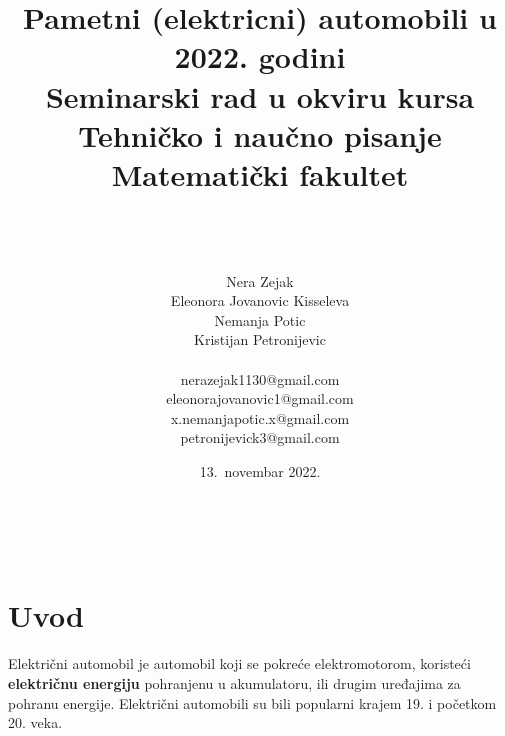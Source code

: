 \documentclass[a4paper]{article}
\begin{document}
\title{Pametni (elektricni) automobili u 2022. godini\vspace{3ex}\\
\small{Seminarski rad u okviru kursa\\
Tehničko i naučno pisanje\\
Matematički fakultet}\vspace{3ex}}
\author{\\\\\\Nera Zejak\\Eleonora Jovanovic Kisseleva\\Nemanja Potic\\Kristijan Petronijevic \\ \\nerazejak1130@gmail.com\\eleonorajovanovic1@gmail.com\\x.nemanjapotic.x@gmail.com\\ petronijevick3@gmail.com\\}
\date{13.~novembar 2022.}\
\maketitle

\maketitle




\newpage

\tableofcontents
\newpage

\section{Uvod}
   Električni automobil je automobil koji se pokreće elektromotorom, koristeći \textbf{električnu energiju} pohranjenu u akumulatoru, ili drugim uređajima za pohranu energije. Električni automobili su bili popularni krajem 19. i početkom 20. veka. 
        
\end{document}
